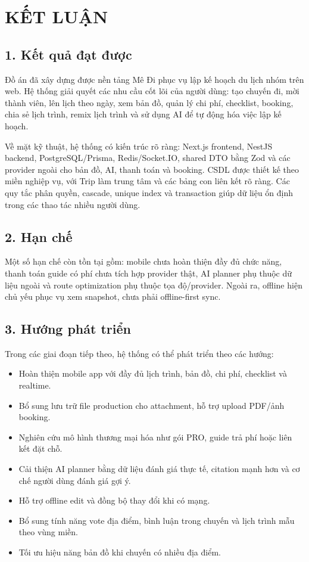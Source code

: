 \documentclass[a4paper]{report}
\newcommand{\ProjectName}{Mê Đi}
\newcommand{\frontchapter}[1]{\chapter*{#1}\phantomsection\addcontentsline{toc}{chapter}{#1}}
\begin{document}
\frontchapter{KẾT LUẬN}

\section*{1. Kết quả đạt được}

Đồ án đã xây dựng được nền tảng \ProjectName{} phục vụ lập kế hoạch du lịch nhóm trên web. Hệ thống giải quyết các nhu cầu cốt lõi của người dùng: tạo chuyến đi, mời thành viên, lên lịch theo ngày, xem bản đồ, quản lý chi phí, checklist, booking, chia sẻ lịch trình, remix lịch trình và sử dụng AI để tự động hóa việc lập kế hoạch.

Về mặt kỹ thuật, hệ thống có kiến trúc rõ ràng: Next.js frontend, NestJS backend, PostgreSQL/Prisma, Redis/Socket.IO, shared DTO bằng Zod và các provider ngoài cho bản đồ, AI, thanh toán và booking. CSDL được thiết kế theo miền nghiệp vụ, với Trip làm trung tâm và các bảng con liên kết rõ ràng. Các quy tắc phân quyền, cascade, unique index và transaction giúp dữ liệu ổn định trong các thao tác nhiều người dùng.

\section*{2. Hạn chế}

Một số hạn chế còn tồn tại gồm: mobile chưa hoàn thiện đầy đủ chức năng, thanh toán guide có phí chưa tích hợp provider thật, AI planner phụ thuộc dữ liệu ngoài và route optimization phụ thuộc tọa độ/provider. Ngoài ra, offline hiện chủ yếu phục vụ xem snapshot, chưa phải offline-first sync.

\section*{3. Hướng phát triển}

Trong các giai đoạn tiếp theo, hệ thống có thể phát triển theo các hướng:

\begin{itemize}
  \item Hoàn thiện mobile app với đầy đủ lịch trình, bản đồ, chi phí, checklist và realtime.
  \item Bổ sung lưu trữ file production cho attachment, hỗ trợ upload PDF/ảnh booking.
  \item Nghiên cứu mô hình thương mại hóa như gói PRO, guide trả phí hoặc liên kết đặt chỗ.
  \item Cải thiện AI planner bằng dữ liệu đánh giá thực tế, citation mạnh hơn và cơ chế người dùng đánh giá gợi ý.
  \item Hỗ trợ offline edit và đồng bộ thay đổi khi có mạng.
  \item Bổ sung tính năng vote địa điểm, bình luận trong chuyến và lịch trình mẫu theo vùng miền.
  \item Tối ưu hiệu năng bản đồ khi chuyến có nhiều địa điểm.
\end{itemize}
\end{document}
